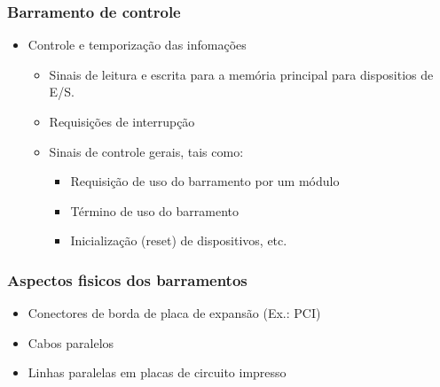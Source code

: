\documentclass[12pt]{article}
\begin{document}
        \subsubsection{Barramento de controle}
        \begin{itemize}
            \item Controle e temporização das infomações
            \begin{itemize}
                \item Sinais de leitura e escrita para a memória principal para 
                dispositios de E/S.
                \item Requisições de interrupção
                \item Sinais de controle gerais, tais como:
                \begin{itemize}
                    \item Requisição de uso do barramento por um módulo
                    \item Término de uso do barramento
                    \item Inicialização (reset) de dispositivos, etc.
                \end{itemize}
            \end{itemize}
        \end{itemize}
        \subsubsection{Aspectos fisicos dos barramentos}
        \begin{itemize}
            \item Conectores de borda de placa de expansão (Ex.: PCI)
            \item Cabos paralelos
            \item Linhas paralelas em placas de circuito impresso
        \end{itemize}
\end{document}
